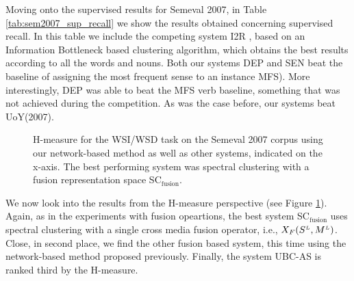 Moving onto the supervised results for Semeval 2007, in Table \ref{tab:sem2007_sup_recall} we show the results obtained concerning supervised recall.  In this table we include the competing system I2R \cite{Niu2007}, based on an Information Bottleneck based clustering algorithm, which obtains the best results according to all the words and nouns. Both our systems DEP and SEN beat the baseline of assigning the most frequent sense to an instance MFS). More interestingly, DEP was able to beat the MFS verb baseline, something that was not achieved during the competition. As was the case before, our systems beat UoY(2007).


\begin{figure}
\centering
{}
\caption{H-measure for the WSI/WSD task on the Semeval 2007 corpus using our network-based method as well as other systems, indicated on the x-axis. The best performing system was spectral clustering with a fusion representation space SC$_{\text{fusion}}$.}
\label{fig:h_measure_semeval2007_nbased}
\end{figure}

We now look into the results from the H-measure perspective (see Figure \ref{fig:h_measure_semeval2007_nbased}). Again, as in the experiments with fusion opeartions, the best system SC$_{\text{fusion}}$ uses spectral clustering with a single cross media fusion operator, i.e., $X_F(S^{\scriptscriptstyle L},M^{\scriptscriptstyle L})$. Close, in second place, we find the other fusion based system, this time using the network-based method proposed previously. Finally, the system UBC-AS  is ranked third by the H-measure.

